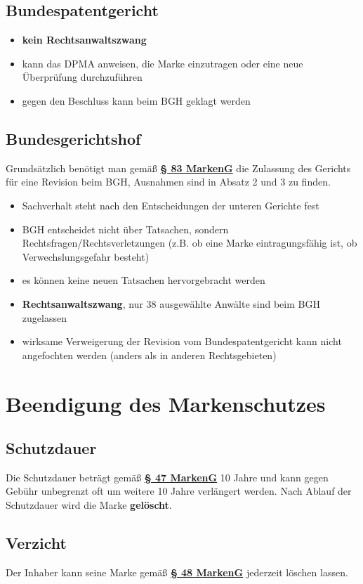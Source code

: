 \documentclass[12pt,A4]{extarticle}
\newcommand{\markenG}[2][]{\textbf{\textcolor{markenGesetzLink}{\href{https://www.gesetze-im-internet.de/markeng/__#2.html}{§ #2 \ifthenelse{\equal{#1}{}}{}{#1 }MarkenG}}}}
\begin{document}
\newpage

\subsection{Bundespatentgericht}
\begin{itemize}
  \item{\textbf{kein Rechtsanwaltszwang}}
  \item{kann das DPMA anweisen, die Marke einzutragen oder eine neue Überprüfung durchzuführen}
  \item{gegen den Beschluss kann beim BGH geklagt werden}
\end{itemize}

\subsection{Bundesgerichtshof}
Grundsätzlich benötigt man gemäß \markenG[Abs. 1]{83} die Zulassung des Gerichts für eine Revision beim BGH, Ausnahmen sind in Absatz 2 und 3 zu finden.
\begin{itemize}
  \item{Sachverhalt steht nach den Entscheidungen der unteren Gerichte fest}
  \item{BGH entscheidet nicht über Tatsachen, sondern Rechtsfragen/Rechtsverletzungen (z.B. ob eine Marke eintragungsfähig ist, ob Verwechslungsgefahr besteht)}
  \item{es können keine neuen Tatsachen hervorgebracht werden}
  \item{\textbf{Rechtsanwaltszwang}, nur 38 ausgewählte Anwälte sind beim BGH zugelassen}
  \item{wirksame Verweigerung der Revision vom Bundespatentgericht kann nicht angefochten werden (anders als in anderen Rechtsgebieten)}
\end{itemize}

\section{Beendigung des Markenschutzes}
\subsection{Schutzdauer}
Die Schutzdauer beträgt gemäß \markenG[Abs. 1]{47} 10 Jahre und kann gegen Gebühr unbegrenzt oft um weitere 10 Jahre verlängert werden. Nach Ablauf der Schutzdauer wird die Marke \textbf{gelöscht}.

\subsection{Verzicht}
Der Inhaber kann seine Marke gemäß \markenG{48} jederzeit löschen lassen.
\end{document}
